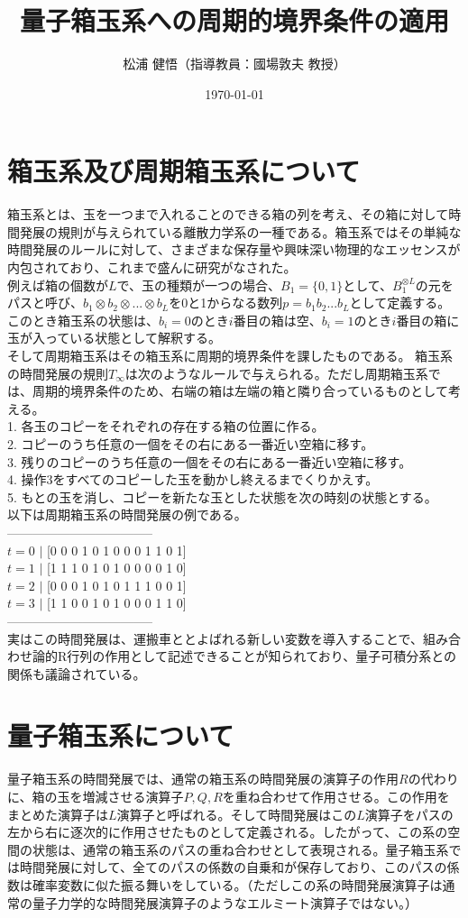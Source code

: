 \documentclass[twocolumn,10pt]{jarticle}
\title{量子箱玉系への周期的境界条件の適用}
\author{松浦 健悟（指導教員：國場敦夫 教授）}
\date{\today}
\begin{document}
\maketitle
\thispagestyle{empty}
\section{箱玉系及び周期箱玉系について}
箱玉系とは、玉を一つまで入れることのできる箱の列を考え、その箱に対して時間発展の規則が与えられている離散力学系の一種である。箱玉系ではその単純な時間発展のルールに対して、さまざまな保存量や興味深い物理的なエッセンスが内包されており、これまで盛んに研究がなされた。\\
例えば箱の個数が$L$で、玉の種類が一つの場合、$B_1 = \{ 0, 1\}$として、$B_1 ^ {\otimes L}$の元をパスと呼び、$b_1 \otimes b_2 \otimes ... \otimes b_L $を0と1からなる数列$p = b_1 b_2 ... b_L $として定義する。このとき箱玉系の状態は、$b_i = 0$のとき$i$番目の箱は空、$b_i = 1$のとき$i$番目の箱に玉が入っている状態として解釈する。\\そして周期箱玉系はその箱玉系に周期的境界条件を課したものである。
箱玉系の時間発展の規則$T_\infty$は次のようなルールで与えられる。ただし周期箱玉系では、周期的境界条件のため、右端の箱は左端の箱と隣り合っているものとして考える。\\
1. 各玉のコピーをそれぞれの存在する箱の位置に作る。\\  
2. コピーのうち任意の一個をその右にある一番近い空箱に移す。\\  
3. 残りのコピーのうち任意の一個をその右にある一番近い空箱に移す。\\  
4. 操作3をすべてのコピーした玉を動かし終えるまでくりかえす。\\  
5. もとの玉を消し、コピーを新たな玉とした状態を次の時刻の状態とする。\\  
以下は周期箱玉系の時間発展の例である。\\  
-----------------------------------\\  
$t = 0$ $|$ [0 0 0 1 0 1 0 0 0 1 1 0 1]\\  
$t = 1$ $|$ [1 1 1 0 1 0 1 0 0 0 0 1 0]\\
$t = 2$ $|$ [0 0 0 1 0 1 0 1 1 1 0 0 1]\\
$t = 3$ $|$ [1 1 0 0 1 0 1 0 0 0 1 1 0]\\
-----------------------------------\\
実はこの時間発展は、運搬車ととよばれる新しい変数を導入することで、組み合わせ論的R行列の作用として記述できることが知られており、量子可積分系との関係も議論されている。
\section{量子箱玉系について}
量子箱玉系の時間発展では、通常の箱玉系の時間発展の演算子の作用$R$の代わりに、箱の玉を増減させる演算子$P,Q,R$を重ね合わせて作用させる。この作用をまとめた演算子は$L$演算子と呼ばれる。そして時間発展はこの$L$演算子をパスの左から右に逐次的に作用させたものとして定義される。したがって、この系の空間の状態は、通常の箱玉系のパスの重ね合わせとして表現される。量子箱玉系では時間発展に対して、全てのパスの係数の自乗和が保存しており、このパスの係数は確率変数に似た振る舞いをしている。（ただしこの系の時間発展演算子は通常の量子力学的な時間発展演算子のようなエルミート演算子ではない。）
\end{document}
